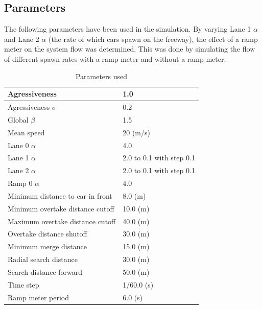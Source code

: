 \documentclass{article}
\begin{document}
  \subsection{Parameters}
    The following parameters have been used in the simulation.
    By varying Lane 1 $\alpha$ and Lane 2 $\alpha$ (the rate of which cars spawn on the
    freeway), the effect of a ramp meter
    on the system flow was determined. This was done by simulating the flow of different
    spawn rates with a ramp meter and without a ramp meter.
    \begin{table}[H]
      \centering
      \begin{tabular}{| l | l |}
        \hline
        Agressiveness & 1.0 \\ \hline
        Agressiveness $\sigma$ & 0.2 \\ \hline
        Global $\beta$ & 1.5 \\ \hline
        Mean speed & 20 (m/s) \\ \hline
        Lane 0 $\alpha$ & 4.0 \\ \hline
        Lane 1 $\alpha$ & 2.0 to 0.1 with step 0.1 \\ \hline
        Lane 2 $\alpha$ & 2.0 to 0.1 with step 0.1 \\ \hline
        Ramp 0 $\alpha$ & 4.0 \\ \hline
        Minimum distance to car in front & 8.0 (m) \\ \hline
        Minimum overtake distance cutoff & 10.0 (m) \\ \hline
        Maximum overtake distance cutoff & 40.0 (m) \\ \hline
        Overtake distance shutoff & 30.0 (m) \\ \hline
        Minimum merge distance & 15.0 (m) \\ \hline
        Radial search distance & 30.0 (m) \\ \hline
        Search distance forward & 50.0 (m) \\ \hline
        Time step & 1/60.0 (s) \\ \hline
        Ramp meter period & 6.0 (s) \\ \hline
      \end{tabular}
      \caption{Parameters used}
      \label{tb:1}
    \end{table}
\end{document}
